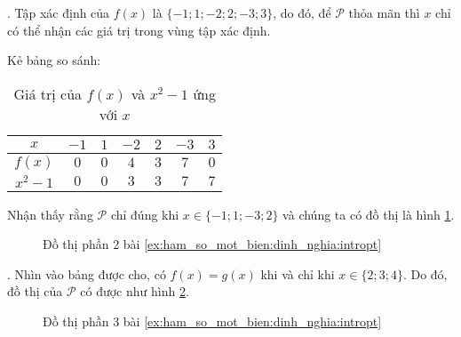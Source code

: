 {
   \begin{minipageindent}{0.48\textwidth}
. Tập xác định của $f(x)$ là $\{-1; 1; -2; 2; -3; 3\}$, do đó, để $\mathcal{P}$ thỏa mãn thì $x$ chỉ có thể nhận các giá trị trong vùng tập xác định.

      Kẻ bảng so sánh:
      \begin{table}[H]
         \centering
         \begin{tabular}{|c|c|c|c|c|c|c|}
            \hline
            $x$ & $-1$ & $1$ & $-2$ & $2$ & $-3$ & $3$\\
            \hline
            $f(x)$ & $0$ & $0$ & $4$ & $3$ & $7$ & $0$\\
            \hline
            $x^2-1$ & $0$ & $0$ & $3$ & $3$ & $7$ & $7$\\
            \hline
         \end{tabular}
         \caption{Giá trị của $f(x)$ và $x^2-1$ ứng với $x$}
         \label{tab:ham_so_mot_bien:dinh_nghia:values3}
      \end{table}

      Nhận thấy rằng $\mathcal{P}$ chỉ đúng khi $x\in \{-1; 1; -3; 2\}$ và chúng ta có đồ thị là hình \ref{fig:ham_so_mot_bien:dinh_nghia:dtp2}.
   \end{minipageindent}
   \hfill
   \begin{minipageindent}{0.48\textwidth}
      \begin{figure}[H]
         \centering
         \caption{Đồ thị phần 2 bài \ref{ex:ham_so_mot_bien:dinh_nghia:intropt}}
         \label{fig:ham_so_mot_bien:dinh_nghia:dtp2}
      \end{figure}
   \end{minipageindent}
}

{
   \begin{minipageindent}{0.48\textwidth}
. Nhìn vào bảng được cho, có $f(x) = g(x)$ khi và chỉ khi $x\in \{2; 3; 4\}$. Do đó, đồ thị của $\mathcal{P}$ có được như hình \ref{fig:ham_so_mot_bien:dinh_nghia:dtp3}.
   \end{minipageindent}
   \hfill
   \begin{minipageindent}{0.48\textwidth}
      \begin{figure}[H]
         \centering
         \caption{Đồ thị phần 3 bài \ref{ex:ham_so_mot_bien:dinh_nghia:intropt}}
         \label{fig:ham_so_mot_bien:dinh_nghia:dtp3}
      \end{figure}
   \end{minipageindent}
}


